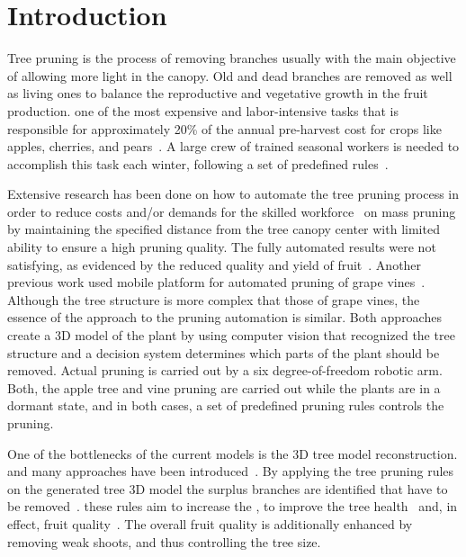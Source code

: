 \section{Introduction}
Tree pruning is the process of removing branches usually with the main
objective of allowing more light in the canopy. Old and dead branches are
removed as well as living ones to balance the reproductive and
vegetative growth in the fruit production.  one of the most
expensive and labor-intensive tasks that is responsible for
approximately 20\% of the annual pre-harvest cost for crops like apples,
cherries, and pears~\cite{karkee_identification_2014}. A large crew of trained seasonal workers is needed to accomplish this task each winter, following a set of predefined rules~\cite{akbar_novel_2016}. 

Extensive research has been done on how to automate the tree pruning process  in order to reduce costs and/or demands for the skilled workforce~\cite{jensen_effects_1980,karkee_identification_2014,moore_mechanical_1958}
on mass pruning by maintaining the specified distance from the tree
canopy center with limited ability to ensure a high pruning quality. The
fully automated results were not satisfying, as evidenced by the reduced quality and
yield of fruit~\cite{karkee_identification_2014}. 
Another previous work used mobile platform for automated pruning of grape vines~\cite{botterill_robot_2017}. 
Although the tree structure is more complex that those of
grape vines, the essence of the approach to the pruning automation is
similar. Both approaches create a 3D model of the plant by using computer vision
that recognized the tree structure and a decision system determines which
parts of the plant should be removed. Actual pruning is carried out by a six degree-of-freedom
robotic arm. Both, the apple tree and vine pruning are carried out while
the plants are in a dormant state, and in both cases, a set of
predefined pruning rules controls the pruning.

One of the bottlenecks of the current models is the 3D tree model
reconstruction. 
and many approaches have been introduced~\cite{livny_automatic_2010,xie_tree_2016,zhang_data-driven_2014}. 
By applying the tree pruning rules on the generated tree 3D model the
surplus branches are identified that have to be removed~\cite{akbar_novel_2016,elfiky_automation_2015,medeiros_modeling_2017}.
 these rules aim to increase the ,  to improve the tree health~\cite{simon_does_2006} and, in effect, fruit quality~\cite{bastias_light_2012}. 
The overall fruit quality is additionally enhanced by removing
weak shoots, and thus controlling the tree size.


